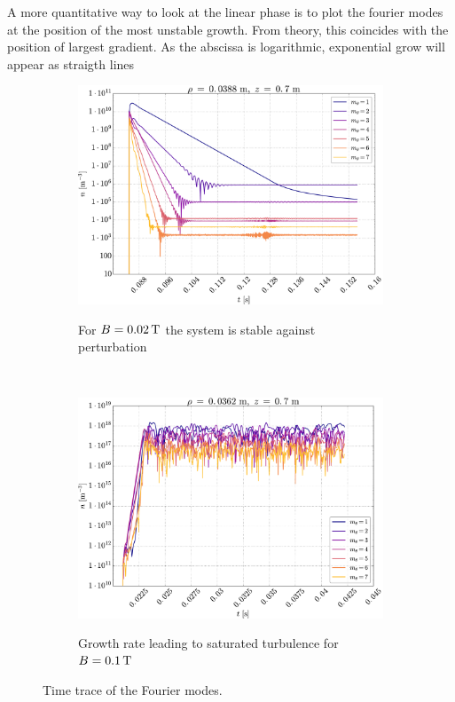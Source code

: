 %
A more quantitative way to look at the linear phase is to plot the fourier modes at the position of the most unstable growth.
From theory, this coincides with the position of largest gradient.
As the abscissa is logarithmic, exponential grow will appear as straigth lines
%
\begin{figure}[htbp]
    \centering
    \begin{subfigure}[h]{1.00\textwidth}
        \centering
        \includegraphics[width=1.0\textwidth]{fig/results/fourierModes/stable}
        \label{fig:fourierStable}
        \caption{For $B=0.02\, \text{T}$ the system is stable against perturbation}
    \end{subfigure}%
    \\
    \begin{subfigure}[h]{1.00\textwidth}
        \centering
        \includegraphics[width=1.0\textwidth]{fig/results/fourierModes/unstable}
        \label{fig:fourierUnstable}
        \caption{Growth rate leading to saturated turbulence for $B=0.1\, \text{T}$}
    \end{subfigure}
    \caption{Time trace of the Fourier modes.}
\end{figure}
